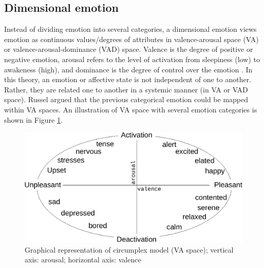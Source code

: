 

\subsection{Dimensional emotion}
Instead of dividing emotion into several categories, a dimensional emotion
views emotion as continuous values/degrees of attributes in valence-arousal
space (VA) or valence-arousal-dominance (VAD) space. Valence is the degree of
positive or negative emotion, arousal refers to the level of activation from
sleepiness (low) to awakeness (high), and dominance is the degree of control
over the emotion \cite{Gunes2010}. In this theory, an emotion or affective
state is not independent of one to another. Rather, they are related one to
another in a systemic manner (in VA or VAD space). Russel argued that the
previous categorical emotion could be mapped within VA spaces. An illustration
of VA space with several emotion categories is shown in Figure
\ref{fig:va_space}.  


\begin{figure}[htbp]
    \centering
    \includegraphics[width=.8\textwidth]{../fig/circumplex-crop.pdf}
\caption{Graphical representation of circumplex model (VA
space)\cite{Posner2005}; vertical axis: arousal; horizontal axis: valence}
    \label{fig:va_space}
\end{figure}

